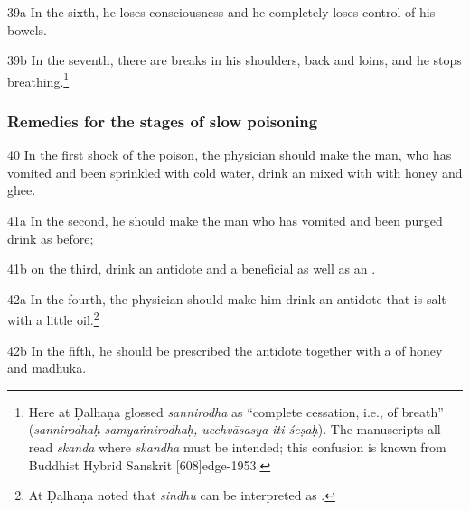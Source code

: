 \begin{translation}
   
    \item[39a]
    In the sixth, he loses consciousness and he completely loses
    control of his bowels.
    
    \item[39b]
    In the seventh, there are breaks in his shoulders, back and loins, and he  
stops breathing.\footnote{%
Here at  Ḍalhaṇa glossed \emph{sannirodha} as
“complete cessation, i.e., of breath” (\emph{sannirodhaḥ 
samyaṅnirodhaḥ, ucchvāsasya iti śeṣaḥ}).
The manuscripts all read \emph{skanda} where \emph{skandha} must be 
intended; this confusion is known from Buddhist Hybrid Sanskrit 
[608]{edge-1953}.}
    
    
    
\subsubsection{Remedies for the stages of slow poisoning}
  \label{dusivisa}
  
    \item[40] In the first shock of the poison, the physician should make the man,
who has vomited and been sprinkled with cold water, drink an
 mixed with with honey and ghee.
    
    \item[41a] In the second, he should make the man who has vomited and been
purged drink as before;
    
    \item[41b]
    on the third, drink an antidote and a beneficial
     as well as an .
    
    
    \item[42a] In the fourth, the physician should make him drink an antidote that
is salt with a little oil.\footnote{At  Ḍalhaṇa noted that
\emph{sindhu} can be interpreted as .}
    
    

    
    \item[42b]
    In the fifth, he should be prescribed the antidote together with a
     of honey and
    \gls{madhuka}.
   

\end{translation}
